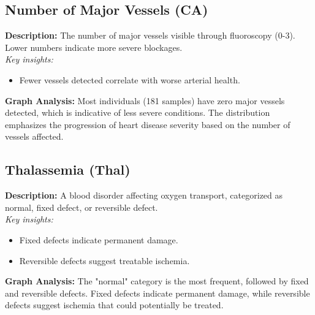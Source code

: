 \documentclass[pdflatex,sn-nature,Numbered]{sn-jnl}%
\theoremstyle{thmstyleone}%
\theoremstyle{thmstyletwo}%
\theoremstyle{thmstylethree}%
\begin{document}
\subsection{Number of Major Vessels (CA)}
\textbf{Description:} 
The number of major vessels visible through fluoroscopy (0-3). Lower numbers indicate more severe blockages. \\
\textit{Key insights:}
\begin{itemize}
    \item Fewer vessels detected correlate with worse arterial health.
\end{itemize}
\textbf{Graph Analysis:} 
Most individuals (181 samples) have zero major vessels detected, which is indicative of less severe conditions. The distribution emphasizes the progression of heart disease severity based on the number of vessels affected.

\subsection{Thalassemia (Thal)}
\textbf{Description:} 
A blood disorder affecting oxygen transport, categorized as normal, fixed defect, or reversible defect. \\
\textit{Key insights:}
\begin{itemize}
    \item Fixed defects indicate permanent damage.
    \item Reversible defects suggest treatable ischemia.
\end{itemize}
\textbf{Graph Analysis:} 
The "normal" category is the most frequent, followed by fixed and reversible defects. Fixed defects indicate permanent damage, while reversible defects suggest ischemia that could potentially be treated.
\end{document}
